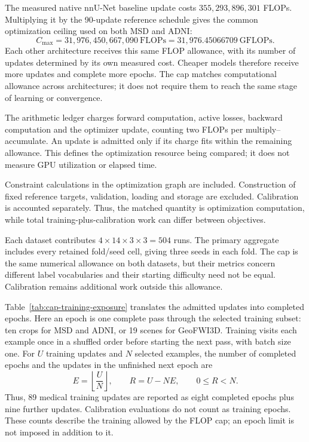 \documentclass[12pt,a4paper]{article}
\begin{document}
The measured native nnU-Net baseline update costs
$355{,}293{,}896{,}301$ FLOPs. Multiplying it by the 90-update reference
schedule gives the common optimization ceiling used on both MSD and ADNI:
\begin{equation}
 C_{\max}=31{,}976{,}450{,}667{,}090\ \mathrm{FLOPs}
          =31{,}976.45066709\ \mathrm{GFLOPs}.
\label{eq:main-numerical-cap}
\end{equation}
Each other architecture receives this same FLOP allowance, with its
number of updates determined by its own measured cost. Cheaper models
therefore receive more updates and complete more epochs. The cap matches
computational allowance across architectures; it does not require them
to reach the same stage of learning or convergence.

The arithmetic ledger charges forward computation, active losses,
backward computation and the optimizer update, counting two FLOPs per
multiply--accumulate. An update is admitted only if its charge fits
within the remaining allowance. This defines the optimization resource
being compared; it does not measure GPU utilization or elapsed time.

Constraint calculations in the optimization graph are included.
Construction of fixed reference targets, validation,
loading and storage are excluded. Calibration is accounted separately.
Thus, the matched quantity is optimization computation, while total
training-plus-calibration work can differ between objectives.

Each dataset contributes $4\times14\times3\times3=504$ runs.
The primary aggregate includes every retained fold/seed cell, giving
three seeds in each fold. The cap is the same numerical allowance on
both datasets, but their metrics concern different label vocabularies
and their starting difficulty need not be equal. Calibration remains
additional work outside this allowance.

Table~\ref{tab:cap-training-exposure} translates the admitted updates
into completed epochs. Here an epoch is one complete pass through the
selected training subset: ten crops for MSD and ADNI, or 19 scenes for
GeoFWI3D. Training visits each example once in a shuffled order before
starting the next pass, with batch size one. For $U$ training updates
and $N$ selected examples, the number of completed epochs and the
updates in the unfinished next epoch are
\begin{equation}
 E=\left\lfloor\frac{U}{N}\right\rfloor,
 \qquad R=U-NE,\qquad 0\leq R<N.
\label{eq:completed-training-epochs}
\end{equation}
Thus, 89 medical training updates are reported as eight completed
epochs plus nine further updates. Calibration evaluations do not count
as training epochs. These counts describe the training allowed by the
FLOP cap; an epoch limit is not imposed in addition to it.
\end{document}
